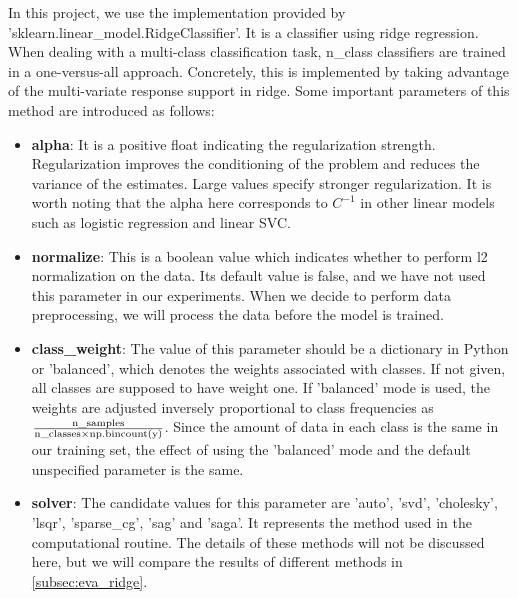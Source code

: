 \documentclass[10pt,journal,compsoc]{IEEEtran}
\begin{document}
In this project, we use the implementation provided by 'sklearn.linear\_model.RidgeClassifier'. It is a classifier using ridge regression. When dealing with a multi-class classification task, n\_class classifiers are trained in a one-versus-all approach. Concretely, this is implemented by taking advantage of the multi-variate response support in ridge. Some important parameters of this method are introduced as follows:
\begin{itemize}
  \item \textbf{alpha}: It is a positive float indicating the regularization strength. Regularization improves the conditioning of the problem and reduces the variance of the estimates. Large values specify stronger regularization. It is worth noting that the alpha here corresponds to $C^{-1}$ in other linear models such as logistic regression and linear SVC.
  \item \textbf{normalize}: This is a boolean value which indicates whether to perform l2 normalization on the data. Its default value is false, and we have not used this parameter in our experiments. When we decide to perform data preprocessing, we will process the data before the model is trained.
  \item \textbf{class\_weight}: The value of this parameter should be a dictionary in Python or 'balanced', which denotes the weights associated with classes. If not given, all classes are supposed to have weight one. If 'balanced' mode is used, the weights are adjusted inversely proportional to class frequencies as $\frac{\rm n\_samples}{\rm n\_classes \times np.bincount(y)}$. Since the amount of data in each class is the same in our training set, the effect of using the 'balanced' mode and the default unspecified parameter is the same.
  \item \textbf{solver}: The candidate values for this parameter are 'auto', 'svd', 'cholesky', 'lsqr', 'sparse\_cg', 'sag' and 'saga'. It represents the method used in the computational routine. The details of these methods will not be discussed here, but we will compare the results of different methods in \ref{subsec:eva_ridge}.
\end{itemize}
\end{document}
